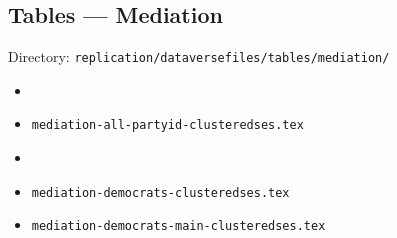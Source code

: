 \documentclass[12pt, a4paper]{article}
\renewcommand\_{\textunderscore\hspace{0pt}}
\begin{document}
\subsection*{Tables --- Mediation}
\noindent Directory: \texttt{replication/dataverse\_files/tables/mediation/}
\begin{itemize}[nosep]
  \item \texttt{}
  \item \texttt{mediation-all-partyid-clusteredses.tex}
  \item \texttt{}
  \item \texttt{mediation-democrats-clusteredses.tex}
  \item \texttt{mediation-democrats-main-clusteredses.tex}
\end{itemize}
\end{document}

